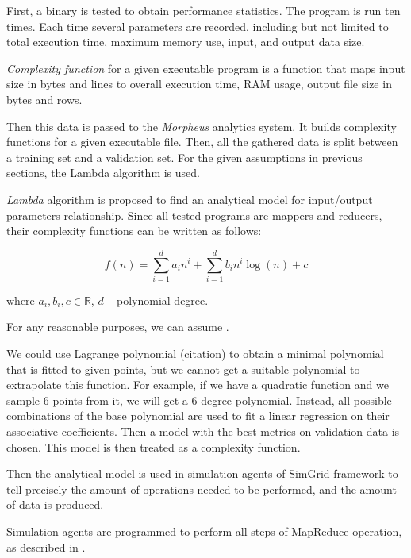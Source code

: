 \documentclass[conference]{IEEEtran} \IEEEoverridecommandlockouts
\begin{document}
    First, a binary is tested to obtain performance statistics. The program is run ten times. Each time several parameters are recorded, including but not limited to total execution time, maximum memory use, input, and output data size.

    \begin{definition}
        \textit{Complexity function} for a given executable program is a function that maps input size in bytes and lines to overall execution time, RAM usage, output file size in bytes and rows.
    \end{definition}

    Then this data is passed to the \textit{Morpheus} analytics system. It builds complexity functions for a given executable file. Then, all the gathered data is split between a training set and a validation set. For the given assumptions in previous sections, the Lambda algorithm is used.

    \textit{Lambda} algorithm is proposed to find an analytical model for input/output parameters relationship. Since all tested programs are mappers and reducers, their complexity functions can be written as follows:

    \begin{equation} 
        f(n) = \sum_{i = 1}^d a_in^i + \sum_{i=1}^d b_in^i\log(n) + c 
    \end{equation} 

    where $a_i, b_i, c \in \mathbb{R}$, $d$ -- polynomial degree.

    For any reasonable purposes, we can assume ​.

    We could use Lagrange polynomial (citation) to obtain a minimal polynomial that is fitted to given points, but we cannot get a suitable polynomial to extrapolate this function. For example, if we have a quadratic function and we sample 6 points from it, we will get a 6-degree polynomial. Instead, all possible combinations of the base polynomial are used to fit a linear regression on their associative coefficients. Then a model with the best metrics on validation data is chosen. This model is then treated as a complexity function.

    Then the analytical model is used in simulation agents of SimGrid framework to tell precisely the amount of operations needed to be performed, and the amount of data is produced.

    Simulation agents are programmed to perform all steps of MapReduce operation, as described in \cite{baseline_model}.
        
\end{document}
